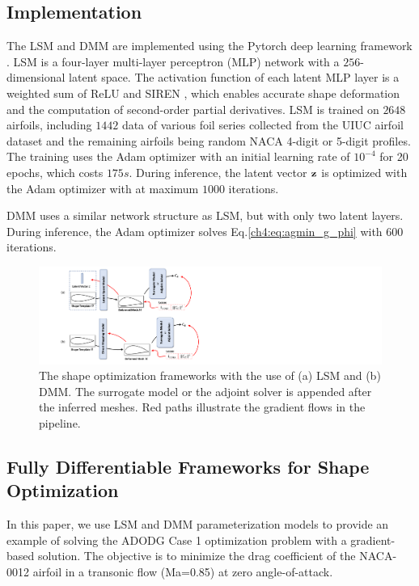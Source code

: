 \subsection{Implementation}
The LSM and DMM are implemented using the Pytorch deep learning framework \cite{ai.Paszke2019}. LSM is a four-layer multi-layer perceptron (MLP) network with a $256$-dimensional latent space. The activation function of each latent MLP layer is a weighted sum of ReLU \cite{ai.Fukushima1975} and SIREN \cite{ai.Sitzmann2020}, which enables accurate shape deformation and the computation of second-order partial derivatives. LSM is trained on $2648$ airfoils, including $1442$ data of various foil series collected from the UIUC airfoil dataset \cite{aa.Selig1996} and the remaining airfoils being random NACA 4-digit or 5-digit profiles. The training uses the Adam optimizer \cite{ai.Kingma2015b} with an initial learning rate of $10^{-4}$ for 20 epochs, which costs $175s$.
During inference, the latent vector $\mathbf{z}$ is optimized with the Adam optimizer with at maximum $1000$ iterations.

DMM uses a similar network structure as LSM, but with only two latent layers. During inference, the Adam optimizer solves Eq.\ref{ch4:eq:agmin_g_phi} with $600$ iterations.

\begin{figure}[tbh]
    \begin{center}
        \includegraphics[width=1\linewidth]{chapter4/fig/framework_optim.pdf}
    \end{center}
    \caption{
        \small The shape optimization frameworks with the use of (a) LSM and (b) DMM. The surrogate model or the adjoint solver is appended after the inferred meshes. Red paths illustrate the gradient flows in the pipeline.
    }
    \label{ch4:fig:framework_optim}
\end{figure}

\subsection{Fully Differentiable Frameworks for Shape Optimization}
In this paper, we use LSM and DMM parameterization models to provide an example of solving the ADODG Case 1 optimization problem with a gradient-based solution. The objective is to minimize the drag coefficient of the NACA-0012 airfoil in a transonic flow (Ma=0.85) at zero angle-of-attack.

